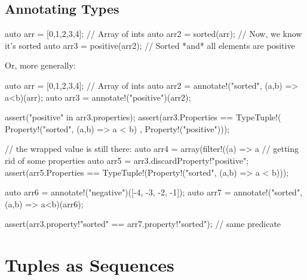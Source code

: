 \subsection{Annotating Types}\label{annotatingtypes}


\begin{dcode}
auto arr = [0,1,2,3,4]; // Array of ints
auto arr2 = sorted(arr); // Now, we know it's sorted
auto arr3 = positive(arr2); // Sorted *and* all elements are positive
\end{dcode}

Or, more generally:

\begin{dcode}
auto arr = [0,1,2,3,4]; // Array of ints
auto arr2 = annotate!("sorted", (a,b) => a<b)(arr);
auto arr3 = annotate!("positive")(arr2);

assert("positive" in arr3.properties);
assert(arr3.Properties == TypeTuple!( Property!("sorted", (a,b) => a < b)
                                    , Property!("positive")));

// the wrapped value is still there:             
auto arr4 = array(filter!((a) => a%
// getting rid of some properties
auto arr5 = arr3.discardProperty!"positive"; 
assert(arr5.Properties == TypeTuple!(Property!("sorted", (a,b) => a < b)));

auto arr6 = annotate!("negative")([-4, -3, -2, -1]);
auto arr7 = annotate!("sorted", (a,b) => a<b)(arr6);

assert(arr3.property!"sorted" == arr7.property!"sorted"); // same predicate                                    
\end{dcode}

\section{Tuples as Sequences}\label{tuplesassequences}


